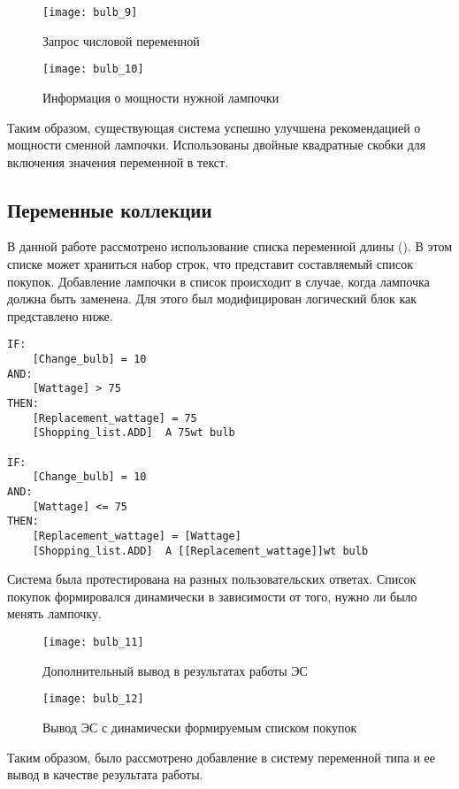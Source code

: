 \begin{figure}[H]
	\centering
	\texttt{[image: bulb\_9]}
	\caption{Запрос числовой переменной}
\end{figure}

\begin{figure}[H]
	\centering
	\texttt{[image: bulb\_10]}
	\caption{Информация о мощности нужной лампочки}
\end{figure}

Таким образом, существующая система успешно улучшена рекомендацией о мощности сменной лампочки. Использованы двойные квадратные скобки для включения значения переменной в текст.

\subsection{Переменные коллекции}

В данной работе рассмотрено использование списка переменной длины (). В этом списке может храниться набор строк, что представит составляемый список покупок. Добавление лампочки в список происходит в случае, когда лампочка должна быть заменена. Для этого был модифицирован логический блок  как представлено ниже.

\begin{lstlisting}[caption={Алгоритм работы ЭС}]
IF:
	[Change_bulb] = 10
AND:
	[Wattage] > 75
THEN:
	[Replacement_wattage] = 75
	[Shopping_list.ADD]  A 75wt bulb

IF:
	[Change_bulb] = 10
AND:
	[Wattage] <= 75
THEN:
	[Replacement_wattage] = [Wattage]
	[Shopping_list.ADD]  A [[Replacement_wattage]]wt bulb
\end{lstlisting}

Система была протестирована на разных пользовательских ответах. Список покупок формировался динамически в зависимости от того, нужно ли было менять лампочку.

\begin{figure}[H]
	\centering
	\texttt{[image: bulb\_11]}
	\caption{Дополнительный вывод в результатах работы ЭС}
\end{figure}

\begin{figure}[H]
	\centering
	\texttt{[image: bulb\_12]}
	\caption{Вывод ЭС с динамически формируемым списком покупок}
\end{figure}


Таким образом, было рассмотрено добавление в систему переменной типа  и ее вывод в качестве результата работы.

